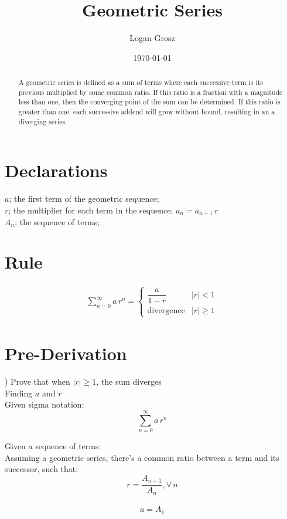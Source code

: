\documentclass{article}
\begin{document}
	
\author{Logan Grosz}
\title{Geometric Series}
\date{\today}

\maketitle

\begin{abstract}
	\noindent A geometric series is defined as a sum of terms where each successive term is its previous multiplied by some common ratio. If this ratio is a fraction with a magnitude less than one, then the converging point of the sum can be determined. If this ratio is greater than one, each successive addend will grow without bound, resulting in an a diverging series.
\end{abstract}

\section{Declarations}

$a$; the first term of the geometric sequence;\\
$r$; the multiplier for each term in the sequence; $a_n = a_{n-1}\, r$\\
$A_n$; the sequence of terms;

\section{Rule}

\begin{gather}
\sum_{n=0}^{\infty}a\,r^n=
	\begin{cases}
		\dfrac{a}{1-r} & |r|<1\\
		\text{divergence} & |r|\geq 1
	\end{cases}
\end{gather}

\section{Pre-Derivation}

) Prove that when $|r|\geq1$, the sum diverges\\

\noindent Finding $a$ and $r$\\
	\indent Given sigma notation:
	$$\sum_{n=0}^{\infty}a\,r^n$$
	
	\indent Given a sequence of terms:\\
	Assuming a geometric series, there's a common ratio between a term and its successor, such that:\\
	$$r=\dfrac{A_{n+1}}{A_n},\forall\,n$$\\
	$$a=A_1$$
\end{document}
